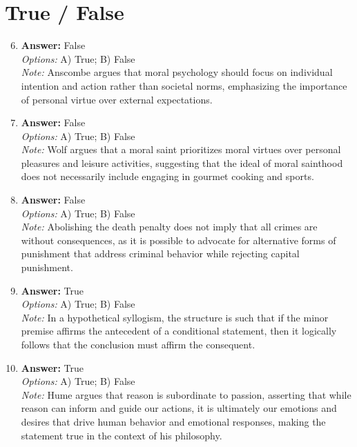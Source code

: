 \documentclass[12pt]{article}
\begin{document}
\section*{True / False}
\begin{enumerate}[label=\arabic*.]
\setcounter{enumi}{5}
\item \textbf{Answer:} False
\\ \textit{Options:} A) True; B) False
\\ \textit{Note:} Anscombe argues that moral psychology should focus on individual intention and action rather than societal norms, emphasizing the importance of personal virtue over external expectations.
\item \textbf{Answer:} False
\\ \textit{Options:} A) True; B) False
\\ \textit{Note:} Wolf argues that a moral saint prioritizes moral virtues over personal pleasures and leisure activities, suggesting that the ideal of moral sainthood does not necessarily include engaging in gourmet cooking and sports.
\item \textbf{Answer:} False
\\ \textit{Options:} A) True; B) False
\\ \textit{Note:} Abolishing the death penalty does not imply that all crimes are without consequences, as it is possible to advocate for alternative forms of punishment that address criminal behavior while rejecting capital punishment.
\item \textbf{Answer:} True
\\ \textit{Options:} A) True; B) False
\\ \textit{Note:} In a hypothetical syllogism, the structure is such that if the minor premise affirms the antecedent of a conditional statement, then it logically follows that the conclusion must affirm the consequent.
\item \textbf{Answer:} True
\\ \textit{Options:} A) True; B) False
\\ \textit{Note:} Hume argues that reason is subordinate to passion, asserting that while reason can inform and guide our actions, it is ultimately our emotions and desires that drive human behavior and emotional responses, making the statement true in the context of his philosophy.
\end{enumerate}
\end{document}
